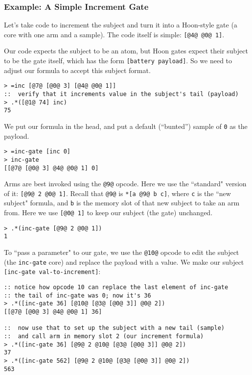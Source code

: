 \documentclass[twoside]{article}
\begin{document}
\subsubsection{Example:  A Simple Increment Gate}

Let's take code to increment the subject and turn it into a Hoon-style gate (a core with one arm and a sample). The code itself is simple: \lstinline[style=inlinecode]{[@4@ @0@ 1]}.

Our code expects the subject to be an atom, but Hoon gates expect their subject to be the gate itself, which has the form \lstinline[style=inlinecode]{[battery payload]}. So we need to adjust our formula to accept this subject format.

\begin{lstlisting}[style=listingcode]
> =inc [@7@ [@0@ 3] [@4@ @0@ 1]]
::  verify that it increments value in the subject's tail (payload)
> .*([@1@ 74] inc)
75
\end{lstlisting}

We put our formula in the head, and put a default (``bunted'') sample of \lstinline[style=inlinecode]{0} as the payload.

\begin{lstlisting}[style=listingblock]
> =inc-gate [inc 0]
> inc-gate
[[@7@ [@0@ 3] @4@ @0@ 1] 0]
\end{lstlisting}

Arms are best invoked using the \lstinline[style=inlinecode]{@9@} opcode. Here we use the ``standard" version of it: \lstinline[style=inlinecode]{[@9@ 2 @0@ 1]}. Recall that \lstinline[style=inlinecode]{@9@} is \lstinline[style=inlinecode]{*[a @9@ b c]}, where \lstinline[style=inlinecode]{c} is the ``new subject" formula, and \lstinline[style=inlinecode]{b} is the memory slot of that new subject to take an arm from. Here we use \lstinline[style=inlinecode]{[@0@ 1]} to keep our subject (the gate) unchanged.

\begin{lstlisting}[style=listingblock]
> .*(inc-gate [@9@ 2 @0@ 1])
1
\end{lstlisting}

To ``pass a parameter" to our gate, we use the \lstinline[style=inlinecode]{@10@} opcode to edit the subject (the \lstinline[style=inlinecode]{inc-gate} core) and replace the payload with a value.  We make our subject \lstinline[style=inlinecode]{[inc-gate val-to-increment]}:

\begin{lstlisting}[style=listingblock]
:: notice how opcode 10 can replace the last element of inc-gate
:: the tail of inc-gate was 0; now it's 36
> .*([inc-gate 36] [@10@ [@3@ [@0@ 3]] @0@ 2])
[[@7@ [@0@ 3] @4@ @0@ 1] 36]

::  now use that to set up the subject with a new tail (sample)
::  and call arm in memory slot 2 (our increment formula)
> .*([inc-gate 36] [@9@ 2 @10@ [@3@ [@0@ 3]] @0@ 2])
37
> .*([inc-gate 562] [@9@ 2 @10@ [@3@ [@0@ 3]] @0@ 2])
563
\end{lstlisting}
\end{document}
